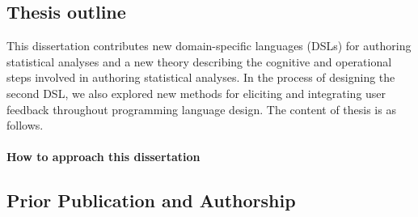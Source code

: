 \subsection{Thesis outline}
This dissertation contributes new domain-specific languages (DSLs) for authoring
statistical analyses and a new theory describing the cognitive and operational
steps involved in authoring statistical analyses. In the process of designing
the second DSL, we also explored new methods for eliciting and integrating user
feedback throughout programming language design. The content of thesis is as
follows. 


\paragraph{How to approach this dissertation} 

\subsection{Prior Publication and Authorship} 